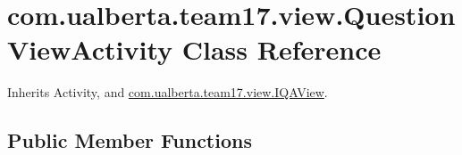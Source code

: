 \hypertarget{classcom_1_1ualberta_1_1team17_1_1view_1_1_question_view_activity}{\section{com.\+ualberta.\+team17.\+view.\+Question\+View\+Activity Class Reference}
\label{classcom_1_1ualberta_1_1team17_1_1view_1_1_question_view_activity}
}


Inherits Activity, and \hyperlink{interfacecom_1_1ualberta_1_1team17_1_1view_1_1_i_q_a_view}{com.\+ualberta.\+team17.\+view.\+I\+Q\+A\+View}.

\subsection*{Public Member Functions}
